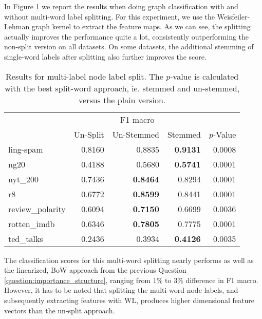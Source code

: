 In Figure \ref{table:results_multi_label_split} we report the results when doing graph classification with and without multi-word label splitting.
For this experiment, we use the Weisfeiler-Lehman graph kernel to extract the feature maps.
As we can see, the splitting actually improves the performance quite a lot, consistently outperforming the non-split version on all datasets.
On some datasets, the additional stemming of single-word labels after splitting also further improves the score.

\begin{table}[htb!]
    \centering
\begin{tabular}{lrrrr}
\toprule
    {} & \multicolumn{3}{c}{F1 macro}  &   \\
     &  Un-Split  &  Un-Stemmed &  Stemmed &   $p$-Value  \\
    \midrule
    ling-spam       & 0.8160 & 0.8835 & \textbf{0.9131} & 0.0008 \\
    ng20            & 0.4188 & 0.5680 & \textbf{0.5741} & 0.0001 \\
    nyt\_200         & 0.7436 & \textbf{0.8464} & 0.8294 & 0.0001 \\
    r8              & 0.6772 & \textbf{0.8599} & 0.8441 & 0.0001 \\
    review\_polarity & 0.6094 & \textbf{0.7150} & 0.6699 & 0.0036 \\
    rotten\_imdb     & 0.6346 & \textbf{0.7805} & 0.7775 & 0.0001 \\
    ted\_talks       & 0.2436 & 0.3934 & \textbf{0.4126} & 0.0035 \\
    \bottomrule
\end{tabular}
\caption[Results: Multi-label split]{Results for multi-label node label split. The $p$-value is calculated with the best split-word approach, ie. stemmed and un-stemmed, versus the plain version.}\label{table:results_multi_label_split}
\end{table}

The classification scores for this multi-word splitting nearly performs as well as the linearized, BoW approach from the previous Question \ref{question:importance_structure}, ranging from 1\% to 3\% difference in F1 macro.
However, it has to be noted that splitting the multi-word node labels, and subsequently extracting features with WL, produces higher dimensional feature vectors than the un-split approach.


